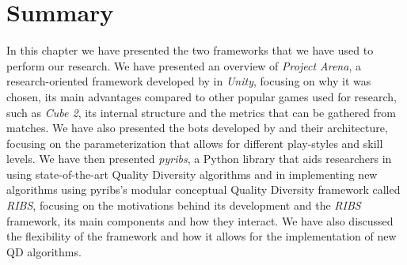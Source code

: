 \section{Summary}
\label{sec:tools_summary}
In this chapter we have presented the two frameworks that we have used to perform our research. We have presented an overview of \textit{Project Arena}, a research-oriented framework developed by \citeauthor{ballabio_online_2018} in \textit{Unity}, focusing on why it was chosen, its main advantages compared to other popular games used for research, such as \textit{Cube 2}, its internal structure and the metrics that can be gathered from matches. We have also presented the bots developed by \citeauthor{bari_evolutionary-based_2023} and their architecture, focusing on the parameterization that allows for different play-styles and skill levels. We have then presented \textit{pyribs}, a Python library that aids researchers in using state-of-the-art Quality Diversity algorithms and in implementing new algorithms using pyribs's modular conceptual Quality Diversity framework called \textit{RIBS}, focusing on the motivations behind its development and the \textit{RIBS} framework, its main components and how they interact. We have also discussed the flexibility of the framework and how it allows for the implementation of new QD algorithms. 